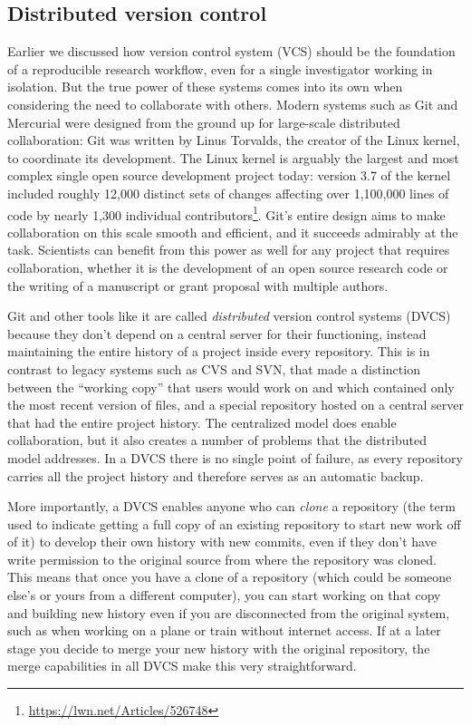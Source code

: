 \documentclass[ChapterTOCs,krantz2]{krantz} %
\begin{document}
\subsection{Distributed version control}

Earlier we discussed how version control system (VCS) should be the foundation of a
reproducible research workflow, even for a single investigator working in
isolation.  But the true power of these systems comes into its own when
considering the need to collaborate with others.  Modern systems such as Git
and Mercurial were designed from the ground up for large-scale distributed
collaboration: Git was written by Linus Torvalds, the creator of the Linux
kernel, to coordinate its development.  The Linux kernel is arguably the
largest and most complex single open source development project today: version
3.7 of the kernel included roughly 12,000 distinct sets of changes affecting
over 1,100,000 lines of code by nearly 1,300 individual
contributors\footnote{\url{https://lwn.net/Articles/526748}}.  Git's entire
design aims to make collaboration on this scale smooth and efficient, and it
succeeds admirably at the task.  Scientists can benefit from this power as well
for any project that requires collaboration, whether it is the development of
an open source research code or the writing of a manuscript or grant proposal
with multiple authors.

Git and other tools like it are called \emph{distributed} version control
systems (DVCS) because they don't depend on a central server for their functioning,
instead maintaining the entire history of a project inside every repository.
This is in contrast to legacy systems such as CVS and SVN, that made a
distinction between the ``working copy'' that users would work on and which
contained only the most recent version of files, and a special repository
hosted on a central server that had the entire project history.  The
centralized model does enable collaboration, but it also creates a number of
problems that the distributed model addresses.  In a DVCS there is no single
point of failure, as every repository carries all the project history and
therefore serves as an automatic backup.

More importantly, a DVCS enables anyone who can \emph{clone} a repository (the
term used to indicate getting a full copy of an existing repository to start
new work off of it) to develop their own history with new commits, even if they
don't have write permission to the original source from where the repository
was cloned.  This means that once you have a clone of a repository (which could
be someone else's or yours from a different computer), you can start working on
that copy and building new history even if you are disconnected from the
original system, such as when working on a plane or train without internet
access.  If at a later stage you decide to merge your new history with the
original repository, the merge capabilities in all DVCS make this very
straightforward.
\end{document}
